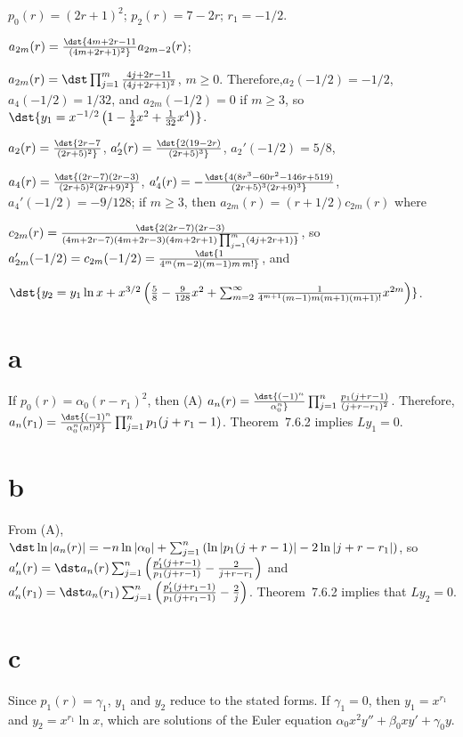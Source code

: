 \documentclass[dvips]{book}
\renewcommand{\exer}[1]{\par\medskip\;\noindent{\color{red}\bf #1.}}
\numberwithin{example}{section}
\numberwithin{equation}{section}
\numberwithin{theorem}{section}
\numberwithin{table}{section}
\numberwithin{figure}{section}
\begin{document}
\exer{7.6.52}
$p_0(r)=(2r+1)^2$;
$p_2(r)=7-2r$;
$r_1=-1/2$.

$a_{2m}(r)=\dst{4m+2r-11\over(4m+2r+1)^2}
a_{2m-2}(r)$;

 $a_{2m}(r)=\dst\prod_{j=1}^m{4j+2r-11\over(4j+2r+1)^2}$,
$m\ge0$. Therefore,$a_2(-1/2)=-1/2$, $a_4(-1/2)=1/32$, and
$a_{2m}(-1/2)=0$ if $m\ge3$, so
$\dst{y_1=x^{-1/2}\left(1-{1\over2}x^2+{1\over32}x^4\right)}$.



$a_2(r)=\dst{2r-7\over(2r+5)^2}$,
$a_2'(r)=\dst{2(19-2r)\over(2r+5)^3}$,
$a_2'(-1/2)=5/8$,


$a_4(r)=\dst{(2r-7)(2r-3)\over(2r+5)^2(2r+9)^2}$,
$a_4'(r)=-\dst{4(8r^3-60r^2-146r+519)\over(2r+5)^3(2r+9)^3}$,
$a_4'(-1/2)=-9/128$; if $m\ge3$, then $a_{2m}(r)=(r+1/2)c_{2m}(r)$
where

$c_{2m}(r)=\dst{2(2r-7)(2r-3)\over(4m+2r-7)(4m+2r-3)(4m+2r+1)\prod_{j=1}^m
(4j+2r+1)}$, so
$a_{2m}'(-1/2)=c_{2m}(-1/2)=\dst{1\over4^m(m-2)(m-1)m\,m!}$, and

$\dst{y_2=y_1\ln x+x^{3/2}\left({5\over8}-{9\over128}x^2
+\sum_{m=2}^\infty{1\over4^{m+1}(m-1)m(m+1)(m+1)!}x^{2m}\right)}$.

\exer{7.6.54}
\part{a} If $p_0(r)=\alpha_0(r-r_1)^2$, then
(A) $a_n(r)=\dst{(-1)^n\over\alpha_0^n}
\prod_{j=1}^n{p_1(j+r-1)\over(j+r-r_1)^2}$.
Therefore,
$a_n(r_1)=\dst{(-1)^n\over\alpha_0^n(n!)^2}\prod_{j=1}^np_1(j+r_1-1)$.
Theorem~7.6.2  implies  $Ly_1=0$.

\part{b}
From (A),
$\dst\ln|a_n(r)|=-n\ln|\alpha_0|+\sum_{j=1}^n\left(\ln|p_1(j+r-1)|
-2\ln|j+r-r_1|\right)$, so
$a_n'(r)=\dst a_n(r)\sum_{j=1}^n\left({p_1'(j+r-1)\over
p_1(j+r-1)}-{2\over j+r-r_1}\right)$ and
$a_n'(r_1)=\dst a_n(r_1)\sum_{j=1}^n\left({p_1'(j+r_1-1)\over
p_1(j+r_1-1)}-{2\over j}\right)$.
Theorem~7.6.2  implies that $Ly_2=0$.

\part{c}  Since $p_1(r)=\gamma_1$, $y_1$ and $y_2$ reduce to the
stated forms.  If $\gamma_1=0$, then $y_1=x^{r_1}$ and $y_2=x^{r_1}\ln
x$, which are solutions of the Euler equation $\alpha_0
x^2y''+\beta_0 xy'+\gamma_0 y$.
\end{document}
